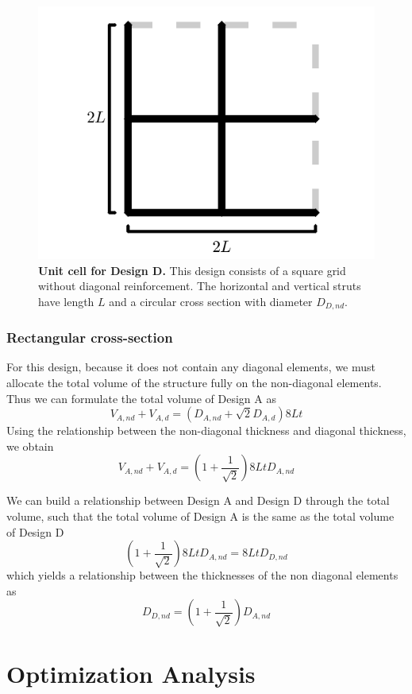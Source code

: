 \documentclass[10pt,twoside]{fernandes_supp}
\begin{document}
\begin{figure}[H]
    \centering
    \includegraphics[width=0.45\linewidth]{SFig5.png}
    \caption{{\bf Unit cell for Design D.} This design consists of a square grid without diagonal reinforcement.  The horizontal and vertical struts have length $L$ and a circular cross section with diameter $D_{D,nd}$.}
    \label{DesignD}
\end{figure}

\subsubsection{Rectangular cross-section}
For this design, because it does not contain any diagonal elements, we must allocate the total volume of the structure fully on the non-diagonal elements. Thus we can formulate the total volume of Design A as
\begin{equation}
	V_{A,nd}+V_{A,d}=(D_{A,nd}+\sqrt{2}D_{A,d})8Lt
\end{equation}
Using the relationship between the non-diagonal thickness and diagonal thickness, we obtain
\begin{equation}
V_{A,nd}+V_{A,d}=\left(1+\frac{1}{\sqrt{2}}\right)8LtD_{A,nd}
\end{equation}

We can build a relationship between Design A and Design D through the total volume, such that the total volume of Design A is the same as the total volume of Design D
\begin{equation}
\left(1+\frac{1}{\sqrt{2}}\right)8LtD_{A,nd}=8LtD_{D,nd}
\end{equation}
which yields a relationship between the thicknesses of the non diagonal elements as
\begin{equation}
	D_{D,nd}=\left(1+\frac{1}{\sqrt{2}}\right)D_{A,nd}
\end{equation}

\section{Optimization Analysis}
\end{document}
